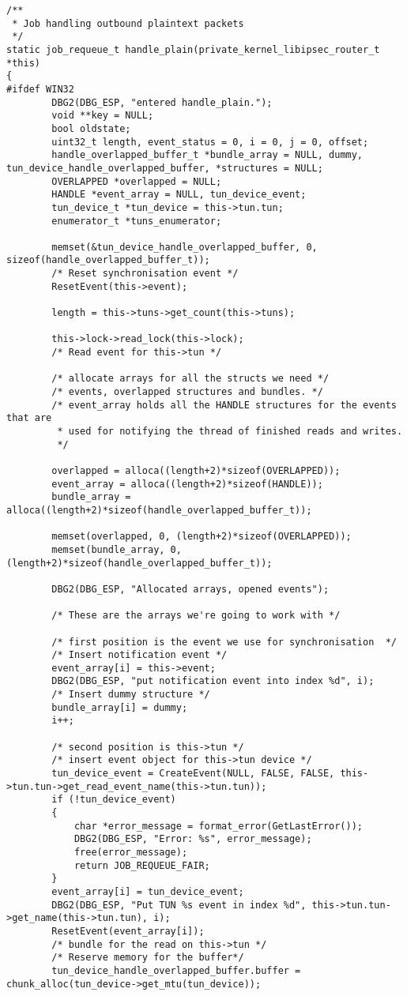 \begin{lstlisting}[caption=Code für handle\_plain auf Windows,label=lst:handle-plain-windows]
/**
 * Job handling outbound plaintext packets
 */
static job_requeue_t handle_plain(private_kernel_libipsec_router_t *this)
{
#ifdef WIN32
        DBG2(DBG_ESP, "entered handle_plain.");
        void **key = NULL;
        bool oldstate;
        uint32_t length, event_status = 0, i = 0, j = 0, offset;
        handle_overlapped_buffer_t *bundle_array = NULL, dummy, tun_device_handle_overlapped_buffer, *structures = NULL;
        OVERLAPPED *overlapped = NULL;
        HANDLE *event_array = NULL, tun_device_event;
        tun_device_t *tun_device = this->tun.tun;
        enumerator_t *tuns_enumerator;

        memset(&tun_device_handle_overlapped_buffer, 0, sizeof(handle_overlapped_buffer_t));
        /* Reset synchronisation event */
        ResetEvent(this->event);

        length = this->tuns->get_count(this->tuns);

        this->lock->read_lock(this->lock);
        /* Read event for this->tun */

        /* allocate arrays for all the structs we need */
        /* events, overlapped structures and bundles. */
        /* event_array holds all the HANDLE structures for the events that are
         * used for notifying the thread of finished reads and writes.
         */

        overlapped = alloca((length+2)*sizeof(OVERLAPPED));
        event_array = alloca((length+2)*sizeof(HANDLE));
        bundle_array = alloca((length+2)*sizeof(handle_overlapped_buffer_t));

        memset(overlapped, 0, (length+2)*sizeof(OVERLAPPED));
        memset(bundle_array, 0, (length+2)*sizeof(handle_overlapped_buffer_t));

        DBG2(DBG_ESP, "Allocated arrays, opened events");

        /* These are the arrays we're going to work with */

        /* first position is the event we use for synchronisation  */
        /* Insert notification event */
        event_array[i] = this->event;
        DBG2(DBG_ESP, "put notification event into index %d", i);
        /* Insert dummy structure */
        bundle_array[i] = dummy;
        i++;

        /* second position is this->tun */
        /* insert event object for this->tun device */
        tun_device_event = CreateEvent(NULL, FALSE, FALSE, this->tun.tun->get_read_event_name(this->tun.tun));
        if (!tun_device_event)
        {
            char *error_message = format_error(GetLastError());
            DBG2(DBG_ESP, "Error: %s", error_message);
            free(error_message);
            return JOB_REQUEUE_FAIR;
        }
        event_array[i] = tun_device_event;
        DBG2(DBG_ESP, "Put TUN %s event in index %d", this->tun.tun->get_name(this->tun.tun), i);
        ResetEvent(event_array[i]);
        /* bundle for the read on this->tun */
        /* Reserve memory for the buffer*/
        tun_device_handle_overlapped_buffer.buffer = chunk_alloc(tun_device->get_mtu(tun_device));


\end{lstlisting}
